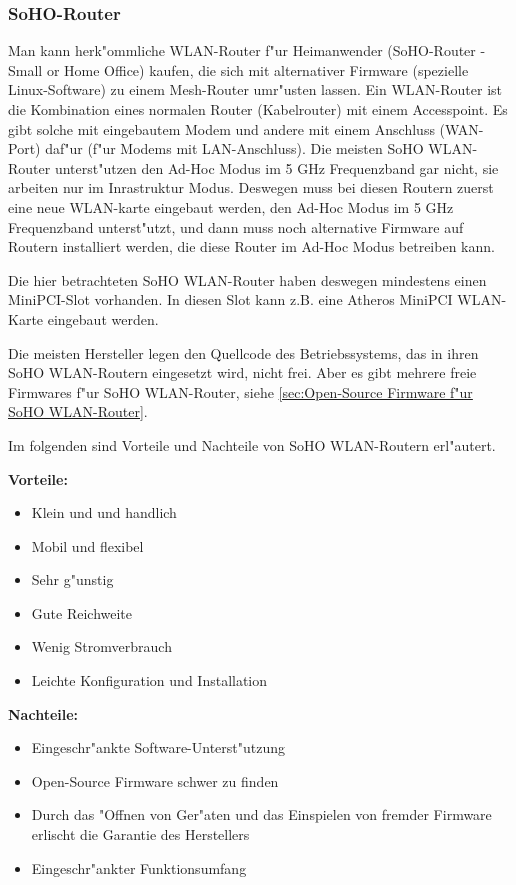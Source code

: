 \subsubsection{SoHO-Router}

Man kann herk"ommliche WLAN-Router f"ur Heimanwender (SoHO-Router - Small
or Home Office) kaufen, die sich mit alternativer Firmware (spezielle
Linux-Software) zu einem Mesh-Router umr"usten lassen. Ein WLAN-Router
ist die Kombination eines normalen Router (Kabelrouter) mit einem
Accesspoint. Es gibt solche mit eingebautem Modem und andere mit einem
Anschluss (WAN-Port) daf"ur (f"ur Modems mit LAN-Anschluss).
Die meisten SoHO WLAN-Router unterst"utzen den Ad-Hoc Modus im 5 GHz
Frequenzband gar nicht, sie arbeiten nur im Inrastruktur Modus. Deswegen
muss bei diesen Routern zuerst eine neue WLAN-karte eingebaut werden,
den Ad-Hoc Modus im 5 GHz Frequenzband unterst"utzt, und dann muss noch
alternative Firmware auf Routern installiert werden, die diese Router
im Ad-Hoc Modus betreiben kann.

Die hier betrachteten SoHO WLAN-Router haben deswegen mindestens einen
MiniPCI-Slot vorhanden. In diesen Slot kann z.B. eine Atheros MiniPCI
WLAN-Karte eingebaut werden.

Die meisten Hersteller legen den Quellcode des Betriebssystems, das in
ihren SoHO WLAN-Routern eingesetzt wird, nicht frei. Aber es gibt
mehrere freie Firmwares f"ur SoHO WLAN-Router, siehe
\ref{sec:Open-Source Firmware f"ur SoHO WLAN-Router}.

Im folgenden sind Vorteile und Nachteile von SoHO WLAN-Routern erl"autert.

\textbf{Vorteile:}

\begin{itemize}
	\item Klein und	und handlich
	\item Mobil und flexibel
	\item Sehr g"unstig
	\item Gute Reichweite
	\item Wenig Stromverbrauch
	\item Leichte Konfiguration und Installation
\end{itemize}

\textbf{Nachteile:}

\begin{itemize}
	\item Eingeschr"ankte Software-Unterst"utzung
	\item Open-Source Firmware schwer zu finden
	\item Durch das "Offnen von Ger"aten und das Einspielen von
	fremder Firmware erlischt die Garantie des Herstellers
	\item Eingeschr"ankter Funktionsumfang
\end{itemize}

